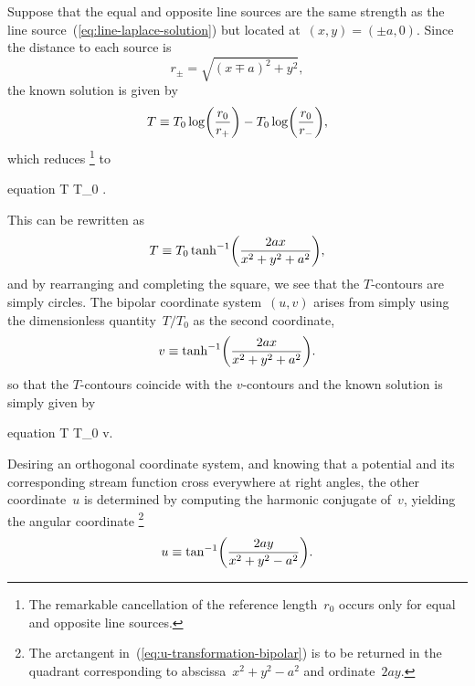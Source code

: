 Suppose that the equal and opposite line sources
are the same strength as the line source~(\ref{eq:line-laplace-solution})
but located at~$(x, y) = (\pm a, 0)$.
Since the distance to each source is
\begin{equation}
  r_\pm = \sqrt{(x \mp a)^2 + y^2},
  \label{eq:bipolar-source-distances}
\end{equation}
the known solution is given by
\begin{equation}
  T \ideq
    T_0 \log \roundbr*{\frac{r_0}{r_+}}
      -
    T_0 \log \roundbr*{\frac{r_0}{r_-}},
  \label{eq:bipolar-laplace-solution-terms}
\end{equation}
which reduces%
\footnote{
  The remarkable cancellation of the reference length~$r_0$
  occurs only for equal and opposite line sources.
}
to
\begin{important}{equation}
  T \ideq T_0 \log {}.
  \label{eq:bipolar-laplace-solution-source-distances}
\end{important}
This can be rewritten as
\begin{equation}
  T \ideq T_0 \tanh^{-1} \roundbr*{\frac{2 a x}{x^2 + y^2 + a^2}},
  \label{eq:bipolar-laplace-solution-inverse-tanh}
\end{equation}
and by rearranging and completing the square,
we see that the $T$-contours are simply circles.
The bipolar coordinate system~$(u, v)$ arises
from simply using the dimensionless quantity~$T / T_0$
as the second coordinate,
\begin{equation}
  v \ideq \tanh^{-1} \roundbr*{\frac{2 a x}{x^2 + y^2 + a^2}}.
  \label{eq:v-transformation-bipolar}
\end{equation}
so that the $T$-contours coincide with the $v$-contours
and the known solution is simply given by
\begin{important}{equation}
  T \ideq T_0 \cdot v.
  \label{eq:bipolar-laplace-solution}
\end{important}
Desiring an orthogonal coordinate system,
and knowing that a potential and its corresponding stream function
cross everywhere at right angles,
the other coordinate~$u$ is determined by computing
the harmonic conjugate of~$v$,
yielding the angular coordinate%
\footnote{
  The arctangent in~(\ref{eq:u-transformation-bipolar})
  is to be returned in the quadrant corresponding to
  abscissa~$x^2 + y^2 - a^2$ and ordinate~$2 a y$.
}
\begin{equation}
  u \ideq \tan^{-1} \roundbr*{\frac{2 a y}{x^2 + y^2 - a^2}}.
  \label{eq:u-transformation-bipolar}
\end{equation}

